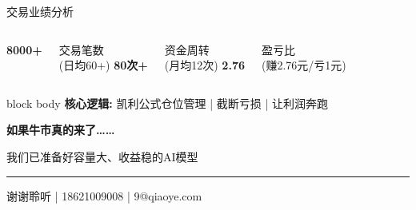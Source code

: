 \documentclass[aspectratio=169, xcolor=table]{beamer}
\newcommand{\HighlightData}[1]{%
    {\color{TongLiangOrange}\Huge\bfseries #1}%
}
\begin{document}
\begin{frame}{交易业绩分析}
    \centering
    \vspace{0.5cm}
    \begin{columns}[T]
            \centering
            \HighlightData{8000+}
            \par\vspace{0.2cm}
            \small 交易笔数 \\ (日均60+)
            \centering
            \HighlightData{80次+}
            \par\vspace{0.2cm}
            \small 资金周转 \\ (月均12次)
            \centering
            \HighlightData{2.76}
            \par\vspace{0.2cm}
            \small 盈亏比 \\ (赚2.76元/亏1元)
    \end{columns}
    
    \vspace{1cm}
    \begin{beamercolorbox}[wd=\textwidth, rounded=true, shadow=true]{block body}
        \centering
        \large \textbf{核心逻辑:} 凯利公式仓位管理 | 截断亏损 | 让利润奔跑
    \end{beamercolorbox}
\end{frame}

\begin{frame}
    \centering
    \vfill
    {\Huge\bfseries\color{TongLiangWhite} 如果牛市真的来了……}
    \vspace{1cm}
    
    {\Large\color{TongLiangCyan} 我们已准备好容量大、收益稳的AI模型}
    
    \vfill
    \rule{0.8\textwidth}{1pt}
    \vspace{0.5cm}
    \small \color{TongLiangGray} 谢谢聆听 | 18621009008 | 9@qiaoye.com
    \vspace{0.5cm}
\end{frame}
\end{document}
